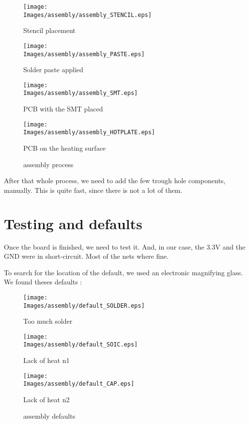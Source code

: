 \begin{figure}[!hbt]
    \centering
    \begin{minipage}[c]{\SmallSchematicWidth}
        \centering
        \texttt{[image: \\Images/assembly/assembly\_STENCIL.eps]}
        \caption*{Stencil placement}
    \end{minipage}%
    \hfill%
    \begin{minipage}[c]{\SmallSchematicWidth}
        \centering
        \texttt{[image: \\Images/assembly/assembly\_PASTE.eps]}
        \caption*{Solder paste applied}
    \end{minipage}%
    \hfill%
    \begin{minipage}[c]{\SmallSchematicWidth}
        \centering
        \texttt{[image: \\Images/assembly/assembly\_SMT.eps]}
        \caption*{PCB with the SMT placed}
    \end{minipage}%
    \hfill%
    \begin{minipage}[c]{\SmallSchematicWidth}
        \centering
        \texttt{[image: \\Images/assembly/assembly\_HOTPLATE.eps]}
        \caption*{PCB on the heating surface}
    \end{minipage}
    \label{img:assembly}
    \caption{assembly process}
\end{figure}
\FloatBarrier

After that whole process, we need to add the few trough hole components, manually.
This is quite fast, since there is not a lot of them.

\section{Testing and defaults}
Once the board is finished, we need to test it. And, in our case, the $3.3 \si{\volt}$ 
and the GND were in short-circuit. Most of the nets where fine. 

To search for the location of the default, we used an electronic magnifying glass.
We found theses defaults : 

\begin{figure}[!hbt]
    \centering
    \begin{minipage}[c]{0.32\textwidth}
        \centering
        \texttt{[image: \\Images/assembly/default\_SOLDER.eps]}
        \caption*{Too much solder}
    \end{minipage}%
    \hfill%
    \begin{minipage}[c]{0.32\textwidth}
        \centering
        \texttt{[image: \\Images/assembly/default\_SOIC.eps]}
        \caption*{Lack of heat n1}
    \end{minipage}%
    \hfill%
    \begin{minipage}[c]{0.32\textwidth}
        \centering
        \texttt{[image: \\Images/assembly/default\_CAP.eps]}
        \caption*{Lack of heat n2}
    \end{minipage}%
    \label{img:defaults}
    \caption{assembly defaults}
\end{figure}
\FloatBarrier

